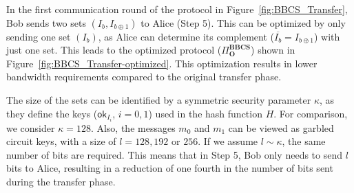 In the first communication round of the protocol in Figure~\ref{fig:BBCS_Transfer}, Bob sends two sets $(I_b, I_{b\oplus 1})$ to Alice (Step 5). This can be optimized by only sending one set $(I_b)$, as Alice can determine its complement ($\overline{I_b} = I_{b\oplus 1}$) with just one set. This leads to the optimized protocol ($\Pi^{\textbf{BBCS}}_{\textbf{O}}$) shown in Figure~\ref{fig:BBCS_Transfer-optimized}. This optimization results in lower bandwidth requirements compared to the original transfer phase.

The size of the sets can be identified by a symmetric security parameter $\kappa$, as they define the keys ($\mathsf{ok}_{I_i}$, $i=0,1$) used in the hash function $H$. For comparison, we consider $\kappa = 128$. Also, the messages $m_0$ and $m_1$ can be viewed as garbled circuit keys, with a size of $l = 128, 192$ or $256$. If we assume $l \sim \kappa$, the same number of bits are required. This means that in Step 5, Bob only needs to send $l$ bits to Alice, resulting in a reduction of one fourth in the number of bits sent during the transfer phase.

